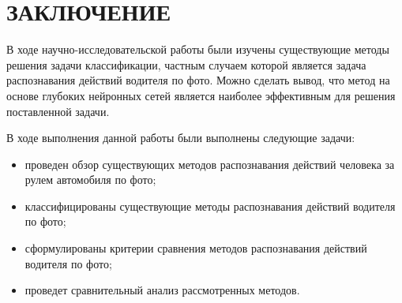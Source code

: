 \section*{ЗАКЛЮЧЕНИЕ}
В ходе научно-исследовательской работы были изучены существующие методы решения задачи классификации, частным случаем которой является задача распознавания действий водителя по фото. Можно сделать вывод, что метод на основе глубоких нейронных сетей является наиболее эффективным для решения поставленной задачи.

В ходе выполнения данной работы были выполнены следующие задачи:
\begin{itemize}[leftmargin=1.6\parindent, label*=---]
	\item проведен обзор существующих методов распознавания действий человека за рулем автомобиля по фото;
	\item классифицированы существующие методы распознавания действий водителя по фото;
	\item сформулированы критерии сравнения методов распознавания действий водителя по фото;
	\item проведет сравнительный анализ рассмотренных методов.
\end{itemize}

\pagebreak